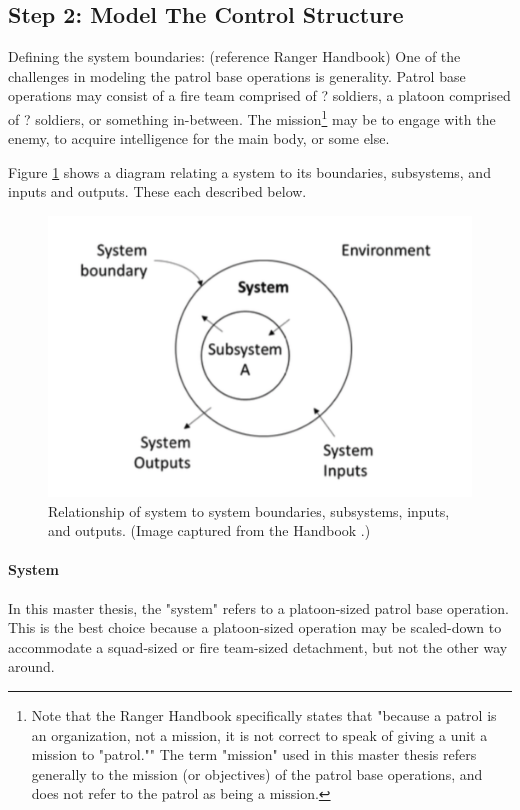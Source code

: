 \documentclass[../../main/main.tex]{subfiles}
\begin{document}
\subsection{Step 2: Model The Control Structure}
Defining the system boundaries: (reference Ranger Handbook)
One of the challenges in modeling the patrol base operations is generality.  Patrol base operations may consist of a fire team comprised of ? soldiers, a platoon comprised of ? soldiers, or something in-between.  The mission\footnote{Note that the Ranger Handbook specifically states that "because a patrol is an organization, not a mission, it is not correct to speak of giving a unit a mission to "patrol.""  The term "mission" used in this master thesis refers generally to the mission (or objectives) of the patrol base operations, and does not refer to the patrol as being a mission.}
 may be to engage with the enemy, to acquire intelligence for the main body, or some else.


Figure \ref{system} shows a diagram relating a system to its boundaries, subsystems, and inputs and outputs.  These each described below.

\begin{figure}[h]
\includegraphics[width=\linewidth]{../figures/system}
\caption{\label{system}Relationship of system to system boundaries, subsystems, inputs, and outputs. (Image captured from the  Handbook \cite{stpa}.)}
\end{figure}
\paragraph*{System}
In this master thesis, the "system" refers to a platoon-sized patrol base operation.  This is the best choice because a platoon-sized operation may be scaled-down to accommodate a squad-sized or fire team-sized detachment, but not the other way around. 
\end{document}
